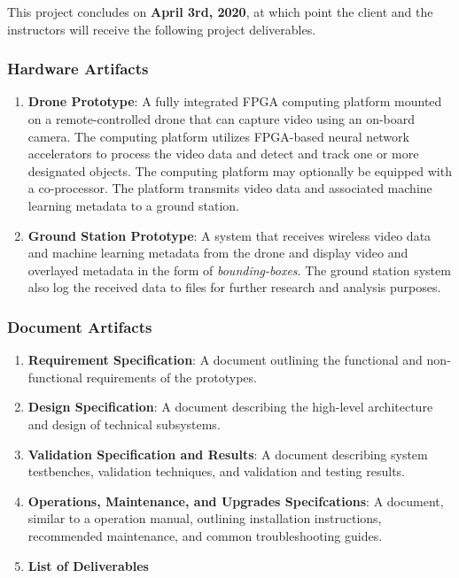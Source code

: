 This project concludes on \textbf{April 3rd, 2020}, at which point the client
and the instructors will receive the following project deliverables.

\subsubsection{Hardware Artifacts}

\begin{enumerate}

\item \textbf{Drone Prototype}:
A fully integrated FPGA computing platform mounted on a remote-controlled
drone that can capture video using an on-board camera.
The computing platform utilizes FPGA-based neural network accelerators to 
process the video data and detect and track one or more designated objects.
The computing platform may optionally be equipped with a co-processor.
The platform transmits video data and associated machine learning metadata
to a ground station.

\item \textbf{Ground Station Prototype}:
A system that receives wireless video data and machine learning metadata from
the drone and display video and overlayed metadata in the form of 
\textit{bounding-boxes}. The ground station system also log the received data 
to files for further research and analysis purposes.

\end{enumerate}

\subsubsection{Document Artifacts}\label{document-artifacts}

\begin{enumerate}

\item\textbf{Requirement Specification}:
A document outlining the functional and non-functional requirements
of the prototypes.

\item \textbf{Design Specification}:
A document describing the high-level architecture and design of technical subsystems.

\item \textbf{Validation Specification and Results}:
A document describing system testbenches, validation techniques, and validation
and testing results.

\item \textbf{Operations, Maintenance, and Upgrades Specifcations}:
A document, similar to a operation manual, outlining installation instructions,
recommended maintenance, and common troubleshooting guides.

\item \textbf{List of Deliverables}

\end{enumerate}

